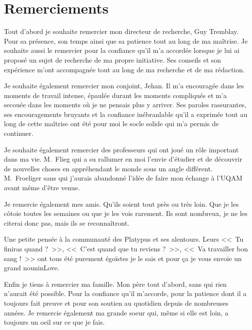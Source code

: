 \chapter*{Remerciements}


Tout d'abord je souhaite remercier mon directeur de recherche, Guy Tremblay.
Pour sa présence, son temps ainsi que sa patience tout au long de ma maîtrise.
Je souhaite aussi le remercier pour la confiance qu'il m'a accordée lorsque je lui ai proposé un sujet de recherche de ma propre initiative.
Ses conseils et son expérience m'ont accompagnée tout au long de ma recherche et de ma rédaction.


Je souhaite également remercier mon conjoint, Jehan.
Il m'a encouragée dans les moments de travail intense, épaulée durant les moments compliqués et m'a secouée dans les moments où je ne pensais plus y arriver. 
Ses paroles rassurantes, ses encouragements bruyants et la confiance inébranlable qu'il a exprimée tout au long de cette maîtrise ont été pour moi le socle solide qui m'a permis de continuer.


Je souhaite également remercier des professeurs qui ont joué un rôle important dans ma vie.
M.~Flieg qui a su rallumer en moi l'envie d'étudier et de découvrir de nouvelles choses en appréhendant le monde sous un angle différent.
M.~Froeliger sans qui j'aurais abandonné l'idée de faire mon échange à l'UQAM avant même d'être venue.


Je remercie également mes amis.
Qu'ils soient tout près ou très loin.
Que je les côtoie toutes les semaines ou que je les vois rarement.
Ils sont nombreux, je ne les citerai donc pas, mais ils se reconnaîtront.


Une petite pensée à la communauté des Platypus et ses alentours.
Leurs <<~Tu finiras quand ?~>>, <<~C'est quand que tu reviens ?~>>, <<~Va travailler bon sang !~>> ont tous été purement égoïstes je le sais et pour ça je vous envoie un grand nouninLove.


Enfin je tiens à remercier ma famille.
Mon père tout d'abord, sans qui rien n'aurait été possible.
Pour la confiance qu'il m'accorde, pour la patience dont il a toujours fait preuve et pour son soutien au quotidien depuis de nombreuses années.
Je remercie également ma grande soeur qui, même si elle est loin, a toujours un oeil sur ce que je fais.
